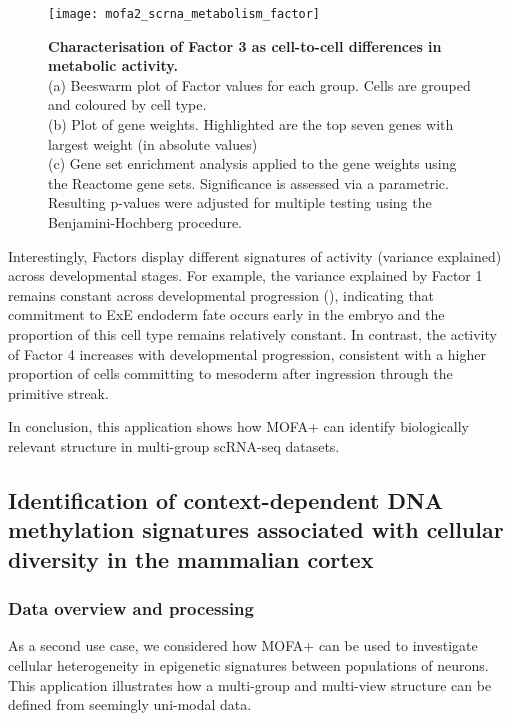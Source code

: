 \begin{figure}[H]
	\centering
	\texttt{[image: mofa2\_scrna\_metabolism\_factor]}
	\caption[]{\textbf{Characterisation of Factor 3 as cell-to-cell differences in metabolic activity.} \\
	(a) Beeswarm plot of Factor values for each group. Cells are grouped and coloured by cell type. \\
	(b) Plot of gene weights. Highlighted are the top seven genes with largest weight (in absolute values) \\
	(c) Gene set enrichment analysis applied to the gene weights using the Reactome gene sets\cite{Fabregat2015}. Significance is assessed via a parametric. Resulting p-values were adjusted for multiple testing using the Benjamini-Hochberg procedure.
	}
	\label{fig:mofa2_scrna_metabolism_factor}
\end{figure}

Interestingly, Factors display different signatures of activity (variance explained) across developmental stages. For example, the variance explained by Factor 1 remains constant across developmental progression (), indicating that commitment to ExE endoderm fate occurs early in the embryo and the proportion of this cell type remains relatively constant. In contrast, the activity of Factor 4 increases with developmental progression, consistent with a higher proportion of cells committing to mesoderm after ingression through the primitive streak. 

In conclusion, this application shows how MOFA+ can identify biologically relevant structure in multi-group scRNA-seq datasets.


\subsection{Identification of context-dependent DNA methylation signatures associated with cellular diversity in the mammalian cortex}

\subsubsection{Data overview and processing}

As a second use case, we considered how MOFA+ can be used to investigate cellular heterogeneity  in epigenetic signatures between populations of neurons. This application illustrates how a multi-group and multi-view structure can be defined from seemingly uni-modal data.

